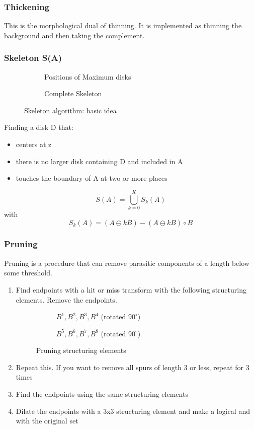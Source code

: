 \subsubsection{Thickening}
This is the morphological dual of thinning. It is implemented as thinning the background and then taking the complement.

\subsubsection{Skeleton S(A)}
\begin{figure}[h!]
\centering
\begin{subfigure}[b]{0.45\textwidth}
\centering
{}
\caption{Positions of Maximum disks}
\end{subfigure}
\begin{subfigure}[b]{0.45\textwidth}
\centering
{}
\caption{Complete Skeleton}
\end{subfigure}
\caption{Skeleton algorithm: basic idea}
\end{figure}
Finding a disk D that:
\begin{itemize}
\item centers at z
\item there is no larger disk containing D and included in A
\item touches the boundary of A at two or more places
\end{itemize}
	\[
		S(A) = \bigcup_{k=0}^{K} S_k(A)
	\]
with
	\[
		S_k(A) = (A \ominus kB) - (A \ominus kB) \circ B
	\]
	
\subsubsection{Pruning}
Pruning is a procedure that can remove parasitic components of a length below some threshold.\\
\begin{enumerate}
\item Find endpoints with a hit or miss transform with the following structuring elements. Remove the endpoints.
\begin{figure}[h!]
\centering
\begin{subfigure}[b]{0.45\textwidth}
\centering
{}
\caption{$B^1, B^2, B^3, B^4$ (rotated $90^\circ$)}
\end{subfigure}
\begin{subfigure}[b]{0.45\textwidth}
\centering
{}
\caption{$B^5, B^6, B^7, B^8$ (rotated $90^\circ$)}
\end{subfigure}
\caption{Pruning structuring elements}
\end{figure}
\item Repeat this. If you want to remove all spurs of length 3 or less, repeat for 3 times
\item Find the endpoints using the same structuring elements
\item Dilate the endpoints with a 3x3 structuring element and make a logical and with the original set
\end{enumerate}

